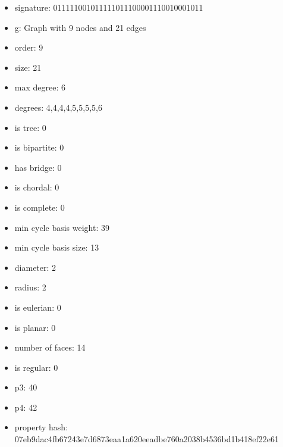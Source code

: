 \newpage
\begin{figure}
\end{figure}
\begin{itemize}
\item signature: 011111001011111011100001110010001011
\item g: Graph with 9 nodes and 21 edges
\item order: 9
\item size: 21
\item max degree: 6
\item degrees: 4,4,4,4,5,5,5,5,6
\item is tree: 0
\item is bipartite: 0
\item has bridge: 0
\item is chordal: 0
\item is complete: 0
\item min cycle basis weight: 39
\item min cycle basis size: 13
\item diameter: 2
\item radius: 2
\item is eulerian: 0
\item is planar: 0
\item number of faces: 14
\item is regular: 0
\item p3: 40
\item p4: 42
\item property hash: 07eb9dac4fb67243e7d6873eaa1a620eeadbe760a2038b4536bd1b418ef22e61
\end{itemize}
